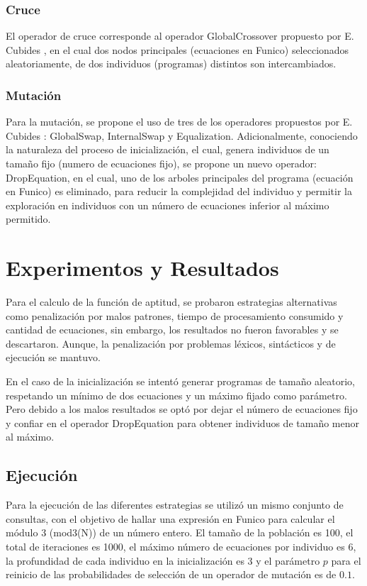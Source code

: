 \documentclass{llncs}
\begin{document}
\subsubsection{Cruce}
El operador de cruce corresponde al operador GlobalCrossover propuesto por E. Cubides \cite{cub:gom:2}, en el cual dos  nodos principales (ecuaciones en Funico) seleccionados aleatoriamente, de dos individuos (programas) distintos son intercambiados.
\subsubsection{Mutación}
Para la mutación, se propone el uso de tres de los operadores propuestos por E. Cubides \cite{cub:gom:2}: GlobalSwap, InternalSwap y Equalization. Adicionalmente, conociendo la naturaleza del proceso de inicialización, el cual, genera individuos de un tamaño fijo (numero de ecuaciones fijo), se propone un nuevo operador: DropEquation, en el cual, uno de los arboles principales del programa (ecuación en Funico) es eliminado, para reducir la complejidad del individuo y permitir la exploración en individuos con un número de ecuaciones inferior al máximo permitido.

\section{Experimentos y Resultados}
Para el calculo de la función de aptitud, se probaron estrategias alternativas como penalización por malos patrones, tiempo de procesamiento consumido y cantidad de ecuaciones, sin embargo, los resultados no fueron favorables y se descartaron. Aunque, la penalización por problemas léxicos, sintácticos y de ejecución se mantuvo.

En el caso de la inicialización se intentó generar programas de tamaño aleatorio, respetando un mínimo de dos ecuaciones y un máximo fijado como parámetro. Pero debido a los malos resultados se optó por dejar el número de ecuaciones fijo y confiar en el operador DropEquation para obtener individuos de tamaño menor al máximo.
\subsection{Ejecución}
Para la ejecución de las diferentes estrategias se utilizó un mismo conjunto de consultas, con el objetivo de hallar una expresión en Funico para calcular el módulo 3 (mod3(N)) de un número entero.
El tamaño de la población es 100, el total de iteraciones es 1000, el máximo número de ecuaciones por individuo es 6, la profundidad de cada individuo en la inicialización es 3 y el parámetro $p$ para el reinicio de las probabilidades de selección de un operador de mutación es de $0.1$.
\end{document}
